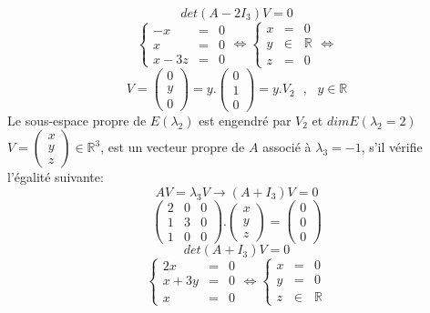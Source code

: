 \documentclass[a4paper,12pt,french]{article}
\begin{document}
	\[det(A-2I_{3})V=0\]
	\[\left \{
	\begin{array}{rcl}
		-x&=&0 \\
		x&=&0\\
		x-3z&=&0
	\end{array}
	\right. \Leftrightarrow \left \{
	\begin{array}{rcl}
		x&=&0 \\
		y& \in& \mathbb{R}\\
		z&=&0
	\end{array}
	\right.\Leftrightarrow \]
	\[V=\begin{pmatrix}
		0  \\
		y  \\
		0
		
	\end{pmatrix}=y.\begin{pmatrix}
		0  \\
		1  \\
		0
		
	\end{pmatrix}=y.V_{2}~~~,~~~ y \in \mathbb{R}\]
	Le sous-espace propre de $E(\lambda_{2})$ est engendré par $V_{2} $ et $dim E(\lambda_{2}=2)$\\
	$V=\begin{pmatrix}
		x  \\
		y  \\
		z
		
	\end{pmatrix} \in \mathbb{R}^{3}$, est un vecteur propre de $A$ associé à $\lambda_{3}=-1$, s'il vérifie l'égalité suivante:\\
	\[AV=\lambda_{3}V \rightarrow (A+I_{3})V=0\]
	\[\begin{pmatrix}
		2 & 0 & 0  \\
		1 & 3 & 0 \\
		1 & 0 & 0
		
	\end{pmatrix}.\begin{pmatrix}
		x   \\
		y   \\
		z 
		
	\end{pmatrix}=\begin{pmatrix}
		0   \\
		0  \\
		0 
		
	\end{pmatrix}\] 
	\[det(A+I_{3})V=0\]
	\[\left \{
	\begin{array}{rcl}
		2x&=&0 \\
		x+3y&=&0\\
		x&=&0
	\end{array}
	\right. \Leftrightarrow \left \{
	\begin{array}{rcl}
		x&=&0 \\
		y&=&0\\
		z&\in& \mathbb{R}
	\end{array}
	\right. \]
\end{document}
